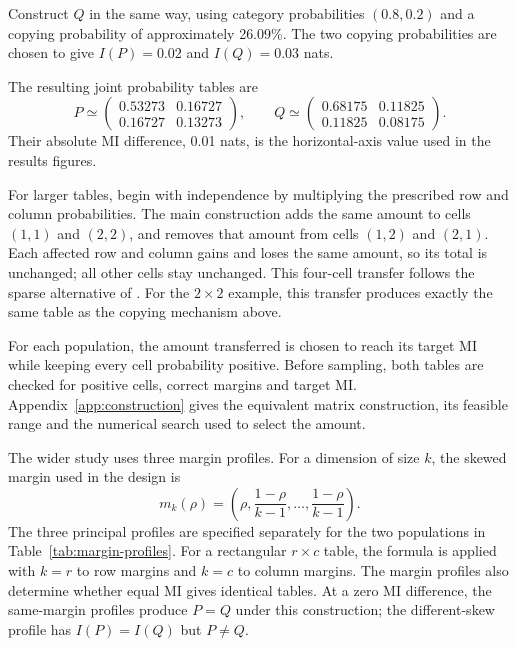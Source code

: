 Construct \(Q\) in the same way, using category probabilities
\((0.8,0.2)\) and a copying probability of approximately 26.09\%.
The two copying probabilities are chosen to give \(I(P)=0.02\) and
\(I(Q)=0.03\) nats.

\begin{samepage}
The resulting joint probability tables are
\begin{equation}
 P\simeq
 \begin{pmatrix}0.53273&0.16727\\0.16727&0.13273\end{pmatrix},
 \qquad
 Q\simeq
 \begin{pmatrix}0.68175&0.11825\\0.11825&0.08175\end{pmatrix}.
 \label{eq:design-example-pair}
\end{equation}
Their absolute MI difference, 0.01 nats, is the horizontal-axis value
used in the results figures.
\par
\end{samepage}

\medskip
{}

For larger tables, begin with independence by multiplying the prescribed
row and column probabilities. The main construction adds the same amount
to cells \((1,1)\) and \((2,2)\), and removes that amount from cells
\((1,2)\) and \((2,1)\). Each affected row and column gains and loses the
same amount, so its total is unchanged; all other cells stay unchanged.
This four-cell transfer follows the sparse alternative of
\citet[Section~3(b)]{berrett2021}. For the \(2\times2\) example, this
transfer produces exactly the same table as the copying mechanism above.

For each population, the amount transferred is chosen to reach its target
MI while keeping every cell probability positive. Before sampling, both
tables are checked for positive cells, correct margins and target MI\@.
Appendix~\ref{app:construction} gives the equivalent matrix construction,
its feasible range and the numerical search used to select the amount.

The wider study uses three margin profiles.
For a dimension of size \(k\), the skewed margin used in the design is
\begin{equation}
 m_k(\rho)=\left(\rho,\frac{1-\rho}{k-1},\ldots,
                   \frac{1-\rho}{k-1}\right).
 \label{eq:skew-margin}
\end{equation}
The three principal profiles are specified separately for the two
populations in Table~\ref{tab:margin-profiles}. For a rectangular
\(r\times c\) table, the formula is applied with \(k=r\) to row margins and
\(k=c\) to column margins.
The margin profiles also determine whether equal MI gives identical tables.
At a zero MI difference, the same-margin profiles
produce \(P=Q\) under this construction; the different-skew profile has
\(I(P)=I(Q)\) but \(P\ne Q\).

